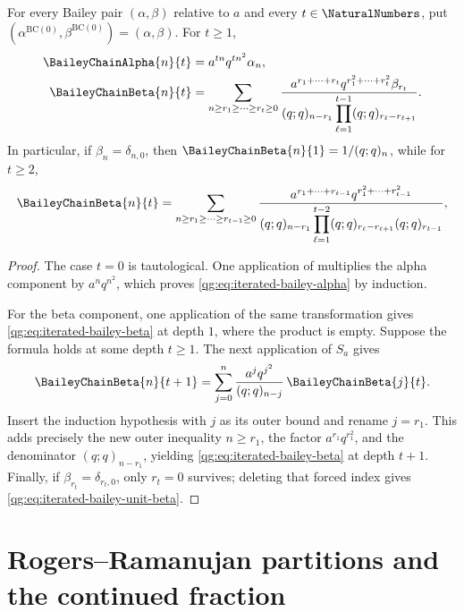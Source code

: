 \begin{lemma}
\label{qg:lem-bailey-chain-iterate}
For every Bailey pair \((\alpha,\beta)\) relative to \(a\) and every
\(t\in\NaturalNumbers\), put
\((\alpha^{\mathrm{BC}(0)},\beta^{\mathrm{BC}(0)})=(\alpha,\beta)\).
For \(t\ge1\),
\begin{align}
 \BaileyChainAlpha{n}{t}
 &=a^{tn}q^{tn^2}\alpha_n,
 \label{qg:eq:iterated-bailey-alpha}\\
 \BaileyChainBeta{n}{t}
 &=
 \sum_{n\ge r_1\ge\cdots\ge r_t\ge0}
 \frac{
   a^{r_1+\cdots+r_t}
   q^{r_1^2+\cdots+r_t^2}\beta_{r_t}}
 {(q;q)_{n-r_1}
  \displaystyle\prod_{\ell=1}^{t-1}
  (q;q)_{r_\ell-r_{\ell+1}}}.
 \label{qg:eq:iterated-bailey-beta}
\end{align}
In particular, if \(\beta_n=\delta_{n,0}\), then
\(\BaileyChainBeta{n}{1}=1/(q;q)_n\), while for \(t\ge2\),
\begin{equation}
 \BaileyChainBeta{n}{t}
 =
 \sum_{n\ge r_1\ge\cdots\ge r_{t-1}\ge0}
 \frac{
   a^{r_1+\cdots+r_{t-1}}
   q^{r_1^2+\cdots+r_{t-1}^2}}
 {(q;q)_{n-r_1}
  \displaystyle\prod_{\ell=1}^{t-2}
  (q;q)_{r_\ell-r_{\ell+1}}
  (q;q)_{r_{t-1}}},
 \label{qg:eq:iterated-bailey-unit-beta}
\end{equation}
\end{lemma}

\begin{proof}
The case \(t=0\) is tautological.  One application of
 multiplies the alpha component by
\(a^nq^{n^2}\), which proves
\eqref{qg:eq:iterated-bailey-alpha} by induction.

For the beta component, one application of the same transformation gives
\eqref{qg:eq:iterated-bailey-beta} at depth \(1\), where the product is
empty.  Suppose the formula holds at some depth \(t\ge1\).  The next
application of \(S_a\) gives
\[
 \BaileyChainBeta{n}{t+1}
 =\sum_{j=0}^{n}
   \frac{a^jq^{j^2}}{(q;q)_{n-j}}\,
   \BaileyChainBeta{j}{t}.
\]
Insert the induction hypothesis with \(j\) as its outer bound and rename
\(j=r_1\).  This adds precisely the new outer inequality
\(n\ge r_1\), the factor
\(a^{r_1}q^{r_1^2}\), and the denominator
\((q;q)_{n-r_1}\), yielding
\eqref{qg:eq:iterated-bailey-beta} at depth \(t+1\).
Finally, if \(\beta_{r_t}=\delta_{r_t,0}\), only \(r_t=0\)
survives; deleting that forced index gives
\eqref{qg:eq:iterated-bailey-unit-beta}.
\end{proof}

\section{Rogers--Ramanujan partitions and the continued fraction}
\label{qg:sec:rogers-ramanujan-forms}

